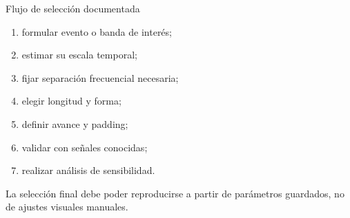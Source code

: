 \documentclass[
  ignorenonframetext,
  aspectratio=169,
  spanish,
]{beamer}
\providecommand{\tightlist}{%
  \setlength{\itemsep}{0pt}\setlength{\parskip}{0pt}}
\begin{document}
\begin{frame}{Flujo de selección documentada}
  \protect{}\label{flujo-de-selecciuxf3n-documentada}
  \begin{enumerate}
    \tightlist
    \item
          formular evento o banda de interés;
    \item
          estimar su escala temporal;
    \item
          fijar separación frecuencial necesaria;
    \item
          elegir longitud y forma;
    \item
          definir avance y padding;
    \item
          validar con señales conocidas;
    \item
          realizar análisis de sensibilidad.
  \end{enumerate}

  \begin{tcolorbox}[enhanced jigsaw, arc=.35mm, bottomrule=.15mm, bottomtitle=1mm, breakable, colback=white, colbacktitle=quarto-callout-tip-color!10!white, colframe=quarto-callout-tip-color-frame, coltitle=black, left=2mm, leftrule=.75mm, opacityback=0, opacitybacktitle=0.6, rightrule=.15mm, title=\textcolor{quarto-callout-tip-color}{\faLightbulb}\hspace{0.5em}{Tip}, titlerule=0mm, toprule=.15mm, toptitle=1mm]

    La selección final debe poder reproducirse a partir de parámetros
    guardados, no de ajustes visuales manuales.

  \end{tcolorbox}
\end{frame}
\end{document}

